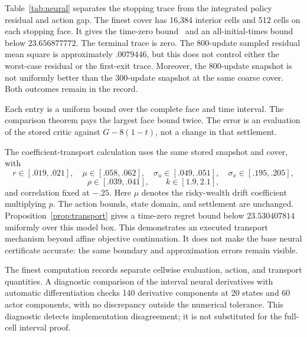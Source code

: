 Table~\ref{tab:neural} separates the stopping trace from the integrated policy residual and action gap. The finest cover has 16,384 interior cells and 512 cells on each stopping face. It gives the time-zero bound \neuralbound\ and an all-initial-times bound below $23.656877772$. The terminal trace is zero. The 800-update sampled residual mean square is approximately $.0079446$, but this does not control either the worst-case residual or the first-exit trace. Moreover, the 800-update snapshot is not uniformly better than the 300-update snapshot at the same coarse cover. Both outcomes remain in the record.

\begin{table}[t]\centering\small
\caption{Stopping-trace errors for the finest neural cover}\label{tab:boundary}

\par\smallskip\footnotesize Each entry is a uniform bound over the complete face and time interval. The comparison theorem pays the largest face bound twice. The error is an evaluation of the stored critic against $G-8(1-t)$, not a change in that settlement.
\end{table}

The coefficient-transport calculation uses the same stored snapshot and cover, with
\[
 r\in[.019,.021],\quad\mu\in[.058,.062],\quad
 \sigma_u\in[.049,.051],\quad\sigma_x\in[.195,.205],
\]
\[
 \rho\in[.039,.041],\qquad k\in[1.9,2.1],
\]
and correlation fixed at $-.25$. Here $\mu$ denotes the risky-wealth drift coefficient multiplying $p$. The action bounds, state domain, and settlement are unchanged. Proposition~\ref{prop:transport} gives a time-zero regret bound below $23.530407814$ uniformly over this model box. This demonstrates an executed transport mechanism beyond affine objective continuation. It does not make the base neural certificate accurate: the same boundary and approximation errors remain visible.

The finest computation records separate cellwise evaluation, action, and transport quantities. A diagnostic comparison of the interval neural derivatives with automatic differentiation checks 140 derivative components at 20 states and 60 actor components, with no discrepancy outside the numerical tolerance. This diagnostic detects implementation disagreement; it is not substituted for the full-cell interval proof.

